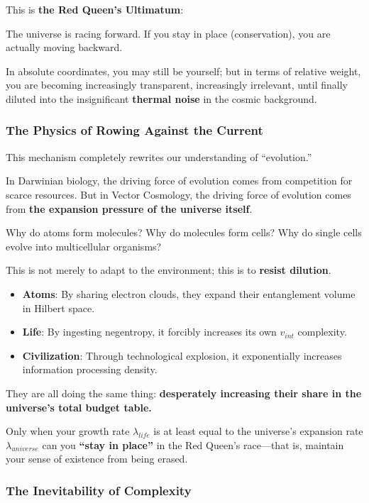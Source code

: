 This is \textbf{the Red Queen's Ultimatum}:

The universe is racing forward. If you stay in place (conservation), you are actually moving backward.

In absolute coordinates, you may still be yourself; but in terms of relative weight, you are becoming increasingly transparent, increasingly irrelevant, until finally diluted into the insignificant \textbf{thermal noise} in the cosmic background.

\subsubsection{The Physics of Rowing Against the Current}

This mechanism completely rewrites our understanding of ``evolution.''

In Darwinian biology, the driving force of evolution comes from competition for scarce resources. But in Vector Cosmology, the driving force of evolution comes from \textbf{the expansion pressure of the universe itself}.

Why do atoms form molecules? Why do molecules form cells? Why do single cells evolve into multicellular organisms?

This is not merely to adapt to the environment; this is to \textbf{resist dilution}.

\begin{itemize}
\item \textbf{Atoms}: By sharing electron clouds, they expand their entanglement volume in Hilbert space.

\item \textbf{Life}: By ingesting negentropy, it forcibly increases its own $v_{int}$ complexity.

\item \textbf{Civilization}: Through technological explosion, it exponentially increases information processing density.
\end{itemize}

They are all doing the same thing: \textbf{desperately increasing their share in the universe's total budget table.}

Only when your growth rate $\lambda_{life}$ is at least equal to the universe's expansion rate $\lambda_{universe}$ can you \textbf{``stay in place''} in the Red Queen's race---that is, maintain your sense of existence from being erased.

\subsubsection{The Inevitability of Complexity}

